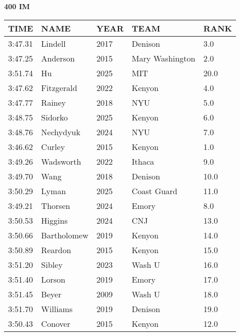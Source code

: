 \begin{minipage}[t]{0.48\textwidth}
\centering
\textbf{400 IM}\\[0.05cm]
\begin{tabular}{@{}p{1.8cm}p{2.8cm}p{1.2cm}p{1.4cm}p{0.8cm}@{}}
\hline
\textbf{TIME} & \textbf{NAME} & \textbf{YEAR} & \textbf{TEAM} & \textbf{RANK} \\
\hline
3:47.31 & Lindell & 2017 & Denison & 3.0 \\
3:47.25 & Anderson & 2015 & Mary Washington & 2.0 \\
3:51.74 & Hu & 2025 & MIT & 20.0 \\
3:47.62 & Fitzgerald & 2022 & Kenyon & 4.0 \\
3:47.77 & Rainey & 2018 & NYU & 5.0 \\
3:48.75 & Sidorko & 2025 & Kenyon & 6.0 \\
3:48.76 & Nechydyuk & 2024 & NYU & 7.0 \\
3:46.62 & Curley & 2015 & Kenyon & 1.0 \\
3:49.26 & Wadsworth & 2022 & Ithaca & 9.0 \\
3:49.70 & Wang & 2018 & Denison & 10.0 \\
3:50.29 & Lyman & 2025 & Coast Guard & 11.0 \\
3:49.21 & Thorsen & 2024 & Emory & 8.0 \\
3:50.53 & Higgins & 2024 & CNJ & 13.0 \\
3:50.66 & Bartholomew & 2019 & Kenyon & 14.0 \\
3:50.89 & Reardon & 2015 & Kenyon & 15.0 \\
3:51.20 & Sibley & 2023 & Wash U & 16.0 \\
3:51.40 & Lorson & 2019 & Emory & 17.0 \\
3:51.45 & Beyer & 2009 & Wash U & 18.0 \\
3:51.70 & Williams & 2019 & Denison & 19.0 \\
3:50.43 & Conover & 2015 & Kenyon & 12.0 \\
\hline
\end{tabular}
\end{minipage}

\vspace{0.4cm}

